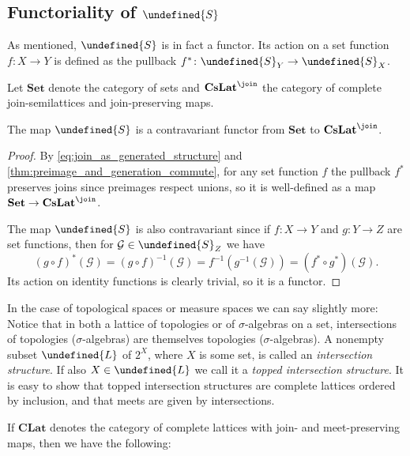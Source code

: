 \documentclass[article, a4paper, 11pt, oneside]{memoir}
\let\mathfrak\undefined
\numberwithin{equation}{chapter}
\newcommand{\calG}{\mathcal{G}}
\newcommand{\strucS}{\mathfrak{S}}
\newcommand{\frakL}{\mathfrak{L}}
\newcommand{\ncat}[1]{\mathbf{#1}} %
\newcommand{\catSet}{\ncat{Set}} %
\newcommand{\catCLat}{\ncat{CLat}} %
\newcommand{\catCJoinLat}{\ncat{CsLat}^{\join}} %
\begin{document}
\subsection{Functoriality of $\strucS$}

As mentioned, $\strucS$ is in fact a functor. Its action on a set function $f \colon X \to Y$ is defined as the pullback $f^* \colon \strucS_Y \to \strucS_X$. 

Let $\catSet$ denote the category of sets and $\catCJoinLat$ the category of complete join-semilattices and join-preserving maps.

\begin{proposition}[Functoriality of $\strucS$, I]
    The map $\strucS$ is a contravariant functor from $\catSet$ to $\catCJoinLat$.
\end{proposition}

\begin{proof}
    By \eqref{eq:join_as_generated_structure} and \cref{thm:preimage_and_generation_commute}, for any set function $f$ the pullback $f^*$ preserves joins since preimages respect unions, so it is well-defined as a map $\catSet \to \catCJoinLat$.
    
    The map $\strucS$ is also contravariant since if $f \colon X \to Y$ and $g \colon Y \to Z$ are set functions, then for $\calG \in \strucS_Z$ we have
    \begin{equation*}
        (g \circ f)^*(\calG)
            = (g \circ f)^{-1}(\calG)
            = f^{-1}(g^{-1}(\calG))
            = (f^* \circ g^*) (\calG).
    \end{equation*}
    Its action on identity functions is clearly trivial, so it is a functor.
\end{proof}

In the case of topological spaces or measure spaces we can say slightly more: Notice that in both a lattice of topologies or of $\sigma$-algebras on a set, intersections of topologies ($\sigma$-algebras) are themselves topologies ($\sigma$-algebras). A nonempty subset $\frakL$ of $2^X$, where $X$ is some set, is called an \emph{intersection structure}. If also $X \in \frakL$ we call it a \emph{topped intersection structure}. It is easy to show that topped intersection structures are complete lattices ordered by inclusion, and that meets are given by intersections.

If $\catCLat$ denotes the category of complete lattices with join- and meet-preserving maps, then we have the following:
\end{document}
